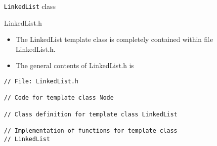 \documentclass{beamer}
\begin{document}

\begin{frame}[fragile]{\lstinline$LinkedList$ class}


\end{frame}


\begin{frame}[fragile]{LinkedList.h}

\begin{itemize}

\item The LinkedList template class is completely contained within
  file LinkedList.h.

\item The general contents of LinkedList.h is

\end{itemize}

\begin{lstlisting}[frame=tblr]
// File: LinkedList.h

// Code for template class Node

// Class definition for template class LinkedList

// Implementation of functions for template class
// LinkedList
\end{lstlisting}



\end{frame}

\end{document}
